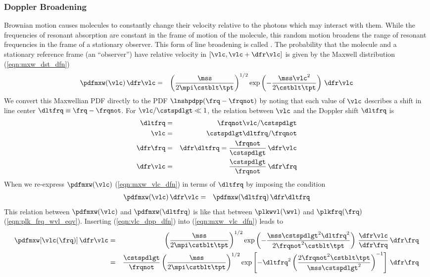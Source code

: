\documentclass[12pt]{article}
\begin{document}
\subsubsection[Doppler Broadening]{Doppler Broadening}\label{sxn:lnshp_dpp}
Brownian motion causes molecules to constantly change their velocity
relative to the photons which may interact with them.
While the frequencies of resonant absorption are constant in the frame
of motion of the molecule, this random motion broadens the range of
resonant frequencies in the frame of a stationary observer.
This form of line broadening is called . 
The probability that the molecule and a stationary reference frame
(an ``observer'') have relative velocity in $[\vlc,\vlc+\dfr\vlc]$ is
given by the Maxwell distribution (\ref{eqn:mxw_dst_dfn})
\begin{eqnarray}
\pdfmxw(\vlc) \,\dfr\vlc & = & 
\left( \frac{\mss}{2\mpi \cstblt \tpt} \right)^{1/2} 
\exp \left( -\frac{\mss \vlc^{2}}{2 \cstblt \tpt} \right) \,\dfr\vlc
\label{eqn:mxw_vlc_dfn}
\end{eqnarray}
We convert this Maxwellian PDF directly to the  PDF $\lnshpdpp(\frq - \frqnot)$ by noting that each value of
$\vlc$ describes a shift in line center $\dltfrq \equiv \frq - \frqnot$.
For $\vlc/\cstspdlgt \ll 1$, the relation between $\vlc$ and the 
Doppler shift $\dltfrq$ is
\begin{eqnarray}
\dltfrq & = & \frqnot \vlc / \cstspdlgt \nonumber \\
\vlc & = & \cstspdlgt \dltfrq / \frqnot \nonumber \\
\dfr\frq & = & \dfr\dltfrq = \frac{\frqnot}{\cstspdlgt} \,\dfr\vlc \nonumber \\
\dfr\vlc & = & \frac{\cstspdlgt}{\frqnot} \,\dfr\frq \nonumber
\label{eqn:vlc_dpp_dfn}
\end{eqnarray}
When we re-express $\pdfmxw(\vlc)$ (\ref{eqn:mxw_vlc_dfn}) in terms of
$\dltfrq$ by imposing the condition
\begin{eqnarray}
\pdfmxw(\vlc) \,\dfr\vlc & = & \pdfmxw(\dltfrq) \,\dfr\dltfrq 
\label{eqn:dpp_dfr_dfn}
\end{eqnarray}
This relation between $\pdfmxw(\vlc)$ and $\pdfmxw(\dltfrq)$ 
is like that between $\plkwvl(\wvl)$ and $\plkfrq(\frq)$
(\ref{eqn:plk_frq_wvl_eqv}). 
Inserting (\ref{eqn:vlc_dpp_dfn}) into (\ref{eqn:mxw_vlc_dfn}) leads 
to 
\begin{eqnarray}
\pdfmxw[\vlc(\frq)] \,\dfr\vlc & = & 
\left( \frac{\mss}{2\mpi \cstblt \tpt} \right)^{1/2} 
\exp \left( -\frac{\mss \cstspdlgt^{2} \dltfrq^{2}}{2 \frqnot^{2} \cstblt
\tpt} \right) \, \frac{\dfr\vlc}{\dfr\frq} \,\dfr\frq \nonumber \\ 
& = & 
\frac{\cstspdlgt}{\frqnot} \left( \frac{\mss}{2\mpi \cstblt \tpt} \right)^{1/2} 
\exp \left[ - \dltfrq^{2} \left( 
\frac{2 \frqnot^{2} \cstblt \tpt}{\mss \cstspdlgt^{2}} \right)^{-1} \right] \,\dfr\frq
\label{eqn:dpp_vlc_pre_dfn}
\end{eqnarray}
\end{document}
